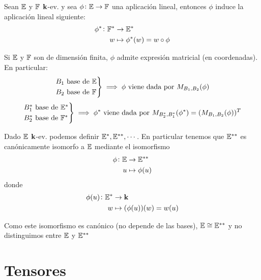 \begin{prop}
	Sean $\mathbb{E}$ y $\mathbb{F}$ $\mathbf{k}$-ev. y sea $\phi \colon \mathbb{E} \to \mathbb{F}$ una
	aplicación lineal, entonces $\phi$ induce la aplicación
	lineal siguiente:
	\[
		\begin{aligned}
		\phi^* \colon \mathbb{F}^* &\to \mathbb{E}^*\\
		w &\mapsto \phi^*(w) = w \circ \phi
		\end{aligned}
	\]
\end{prop}
\begin{obs}
	Si $\mathbb{E}$ y $\mathbb{F}$ son de dimensión finita, $\phi$ admite expresión
	matricial (en coordenadas). En particular:
	\[
    	\displaystyle \begin{rcases} B_1 \text{ base de } \mathbb{E} \\ B_2
    	\text{ base de } \mathbb{F} \end{rcases} \implies \phi \text{ viene dada por }
    	M_{B_1,B_2}(\phi)
	\]
	\[
	    \displaystyle \begin{rcases} B_1^*
    	\text{ base de } \mathbb{E}^* \\ B_2^* \text{ base de } \mathbb{F}^*
    	\end{rcases} \implies \phi^* \text{ viene dada por }
	    M_{B_2^*,B_1^*}(\phi^*) = (M_{B_1,B_2}(\phi))^T
	\]
\end{obs}
\begin{prop}
	Dado $\mathbb{E}$ $\mathbf{k}$-ev. podemos definir $\mathbb{E}^*,\mathbb{E}^{**},\cdots$. En
	particular tenemos que $\mathbb{E}^{**}$ es canónicamente isomorfo a
	$\mathbb{E}$ mediante el isomorfismo
	\[
		\begin{aligned}
			\phi \colon \mathbb{E} &\to \mathbb{E}^{**}\\
			u &\mapsto \phi(u)
		\end{aligned}
	\]
	donde
	\[
		\begin{aligned}
			\phi(u) \colon \mathbb{E}^* &\to \mathbf{k} \\
			w &\mapsto (\phi(u))(w) = w(u)
		\end{aligned}
	\]
\end{prop}
\begin{obs}
	Como este isomorfismo es canónico (no depende de las bases),
	$\mathbb{E} \cong \mathbb{E}^{**}$ y no distinguimos entre $\mathbb{E}$ y $\mathbb{E}^{**}$
\end{obs}



\section{Tensores}

